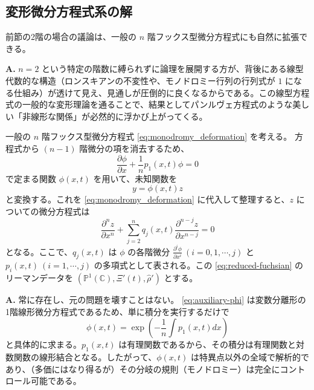 \subsection{変形微分方程式系の解}
前節の2階の場合の議論は、一般の $n$ 階フックス型微分方程式にも自然に拡張できる。

\begin{Q}
\textbf{A.} $n=2$ という特定の階数に縛られずに論理を展開する方が、背後にある線型代数的な構造（ロンスキアンの不変性や、モノドロミー行列の行列式が $1$ になる仕組み）が透けて見え、見通しが圧倒的に良くなるからである。この線型方程式の一般的な変形理論を通ることで、結果としてパンルヴェ方程式のような美しい「非線形な関係」が必然的に浮かび上がってくる。
\end{Q}

一般の $n$ 階フックス型微分方程式 \eqref{eq:monodromy_deformation} を考える。
方程式から $(n-1)$ 階微分の項を消去するため、
\begin{equation}\label{eq:auxiliary-phi}
\frac{\partial \phi}{\partial x} + \frac{1}{n}p_{1}(x,t)\phi = 0
\end{equation}
で定まる関数 $\phi(x,t)$ を用いて、未知関数を
\[
y = \phi(x,t)z
\]
と変換する。これを \eqref{eq:monodromy_deformation} に代入して整理すると、$z$ についての微分方程式は
\begin{equation}\label{eq:reduced-fuchsian}
\frac{\partial^{n}z}{\partial x^{n}} + \sum_{j=2}^{n} q_{j}(x,t)\frac{\partial^{n-j}z}{\partial x^{n-j}} = 0
\end{equation}
となる。ここで、$q_{j}(x,t)$ は $\phi$ の各階微分 $\frac{\partial^i \phi}{\partial x^i} \ (i=0,1,\cdots,j)$ と $p_{i}(x,t) \ (i=1,\cdots,j)$ の多項式として表される。この \eqref{eq:reduced-fuchsian} のリーマンデータを $(\mathbb{P}^{1}(\mathbb{C}), \Xi'(t), \hat{\rho}')$ とする。

\begin{Q}
\textbf{A.} 常に存在し、元の問題を壊すことはない。
\eqref{eq:auxiliary-phi} は変数分離形の1階線形微分方程式であるため、単に積分を実行するだけで
\[
\phi(x,t) = \exp\left( -\frac{1}{n} \int p_1(x,t) dx \right)
\]
と具体的に求まる。$p_1(x,t)$ は有理関数であるから、その積分は有理関数と対数関数の線形結合となる。したがって、$\phi(x,t)$ は特異点以外の全域で解析的であり、（多価にはなり得るが）その分岐の規則（モノドロミー）は完全にコントロール可能である。
\end{Q}


